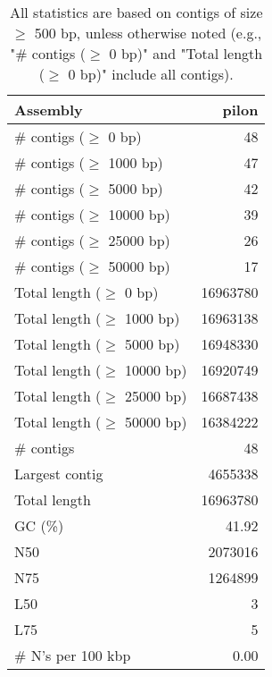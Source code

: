 \documentclass[12pt,a4paper]{article}
\begin{document}
\begin{table}[ht]
\begin{center}
\caption{All statistics are based on contigs of size $\geq$ 500 bp, unless otherwise noted (e.g., "\# contigs ($\geq$ 0 bp)" and "Total length ($\geq$ 0 bp)" include all contigs).}
\begin{tabular}{|l*{1}{|r}|}
\hline
Assembly & pilon \\ \hline
\# contigs ($\geq$ 0 bp) & 48 \\ \hline
\# contigs ($\geq$ 1000 bp) & 47 \\ \hline
\# contigs ($\geq$ 5000 bp) & 42 \\ \hline
\# contigs ($\geq$ 10000 bp) & 39 \\ \hline
\# contigs ($\geq$ 25000 bp) & 26 \\ \hline
\# contigs ($\geq$ 50000 bp) & 17 \\ \hline
Total length ($\geq$ 0 bp) & 16963780 \\ \hline
Total length ($\geq$ 1000 bp) & 16963138 \\ \hline
Total length ($\geq$ 5000 bp) & 16948330 \\ \hline
Total length ($\geq$ 10000 bp) & 16920749 \\ \hline
Total length ($\geq$ 25000 bp) & 16687438 \\ \hline
Total length ($\geq$ 50000 bp) & 16384222 \\ \hline
\# contigs & 48 \\ \hline
Largest contig & 4655338 \\ \hline
Total length & 16963780 \\ \hline
GC (\%) & 41.92 \\ \hline
N50 & 2073016 \\ \hline
N75 & 1264899 \\ \hline
L50 & 3 \\ \hline
L75 & 5 \\ \hline
\# N's per 100 kbp & 0.00 \\ \hline
\end{tabular}
\end{center}
\end{table}
\end{document}
